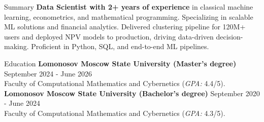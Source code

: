 \documentclass{resume}
\begin{document}
	\begin{rSection}{Summary}
		\textbf{Data Scientist with 2+ years of experience} in classical machine learning, econometrics,
		and mathematical programming. Specializing in scalable ML solutions and financial analytics.
		Delivered clustering pipeline for 120M+ users and deployed NPV models to production, driving
		data-driven decision-making. Proficient in Python, SQL, and end-to-end ML pipelines.
	\end{rSection}

	\begin{rSection}{Education}
		\textbf{Lomonosov Moscow State University (Master's degree)} \hfill {September 2024 - June 2026}\\
		Faculty of Computational Mathematics and Cybernetics (\textit{GPA:} 4.4/5).\\
		\textbf{Lomonosov Moscow State University (Bachelor's degree)} \hfill {September 2020 - June 2024}\\
		Faculty of Computational Mathematics and Cybernetics (\textit{GPA:} 4.3/5).
	\end{rSection}
\end{document}
